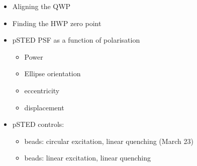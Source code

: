 \begin{itemize}
	\item Aligning the QWP
	\item Finding the HWP zero point
	\item pSTED PSF as a function of polarisation
	\begin{itemize}
		\item Power
		\item Ellipse orientation
		\item eccentricity
		\item displacement
	\end{itemize}
	\item pSTED controls:
	\begin{itemize}
		\item beads: circular excitation, linear quenching (March 23)
		\item beads: linear excitation, linear quenching
	\end{itemize}
\end{itemize}





























